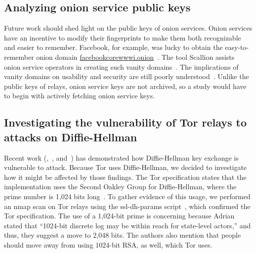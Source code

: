 \subsection{Analyzing onion service public keys}
Future work should shed light on the public keys of onion services.  Onion
services have an incentive to modify their fingerprints to make them both
recognizable and easier to remember.  Facebook, for example, was lucky to
obtain the easy-to-remember onion domain
\url{facebookcorewwwi.onion}~\cite{facebook}.  The tool Scallion assists onion
service operators in creating such vanity domains~\cite{scallion}.  The
implications of vanity domains on usability and security are still poorly
understood~\cite{vanity-domains}.  Unlike the public keys of relays, onion
service keys are not archived, so a study would have to begin with actively
fetching onion service keys.

\subsection{Investigating the vulnerability of Tor relays to attacks on Diffie-Hellman}
Recent work (\cite{weakdh15},~\cite{Valenta2017a}, and~\cite{Dorey2017a}) 
has demonstrated how Diffie-Hellman key exchange is vulnerable to attack.  
Because Tor uses Diffie-Hellman, we decided to investigate how it might be 
affected by those findings.  The Tor specification states that the implementation
uses the Second Oakley Group for Diffie-Hellman, where the prime number is 1,024 
bits long~\cite[\S~0.3]{torspec}. To gather evidence of this usage, we performed 
an nmap scan on Tor relays using the ssl-dh-params script~\cite{nmapdhscript}, 
which confirmed the Tor specification. The use of a 1,024-bit prime is 
concerning because Adrian \ea~\cite{weakdh15} stated that 
``1024-bit discrete log may be within reach for state-level actors,'' and 
thus, they suggest a move to 2,048 bits. The authors also mention that 
people should move away from using 1024-bit RSA, as well, which Tor uses.

